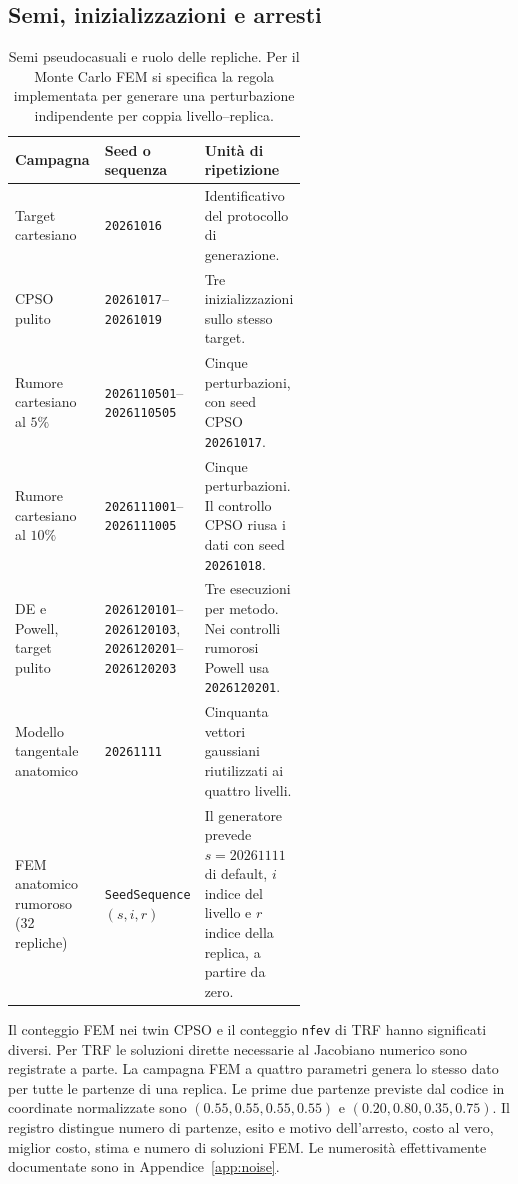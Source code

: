 \subsection{Semi, inizializzazioni e arresti}
\begin{table}[!htbp]\centering\small
\caption{Semi pseudocasuali e ruolo delle repliche. Per il Monte Carlo FEM si specifica la regola implementata per generare una perturbazione indipendente per coppia livello--replica.}
\label{tab:app-seeds}
\begin{tabularx}{0.98\linewidth}{@{}p{0.31\linewidth}p{0.27\linewidth}X@{}}\toprule
Campagna & Seed o sequenza & Unità di ripetizione\\\midrule
Target cartesiano & \texttt{20261016} & Identificativo del protocollo di generazione.\\
CPSO pulito & \texttt{20261017}--\texttt{20261019} & Tre inizializzazioni sullo stesso target.\\
Rumore cartesiano al $5\%$ & \texttt{2026110501}--\texttt{2026110505} & Cinque perturbazioni, con seed CPSO \texttt{20261017}.\\
Rumore cartesiano al $10\%$ & \texttt{2026111001}--\texttt{2026111005} & Cinque perturbazioni. Il controllo CPSO riusa i dati con seed \texttt{20261018}.\\
DE e Powell, target pulito & \texttt{2026120101}--\texttt{2026120103}, \texttt{2026120201}--\texttt{2026120203} & Tre esecuzioni per metodo. Nei controlli rumorosi Powell usa \texttt{2026120201}.\\
Modello tangentale anatomico & \texttt{20261111} & Cinquanta vettori gaussiani riutilizzati ai quattro livelli.\\
FEM anatomico rumoroso (32 repliche) & \texttt{SeedSequence} $(s,i,r)$ & Il generatore prevede $s=20261111$ di default, $i$ indice del livello e $r$ indice della replica, a partire da zero.\\
\bottomrule\end{tabularx}
\end{table}

Il conteggio FEM nei twin CPSO e il conteggio \texttt{nfev} di TRF hanno significati diversi. Per TRF le soluzioni dirette necessarie al Jacobiano numerico sono registrate a parte. La campagna FEM a quattro parametri genera lo stesso dato per tutte le partenze di una replica. Le prime due partenze previste dal codice in coordinate normalizzate sono $(0.55,0.55,0.55,0.55)$ e $(0.20,0.80,0.35,0.75)$. Il registro distingue numero di partenze, esito e motivo dell'arresto, costo al vero, miglior costo, stima e numero di soluzioni FEM. Le numerosità effettivamente documentate sono in Appendice~\ref{app:noise}.

